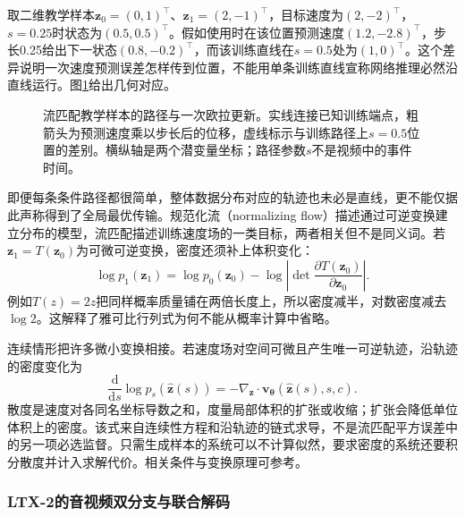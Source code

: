 取二维教学样本$\bm z_0=(0,1)^\top$、$\bm z_1=(2,-1)^\top$，目标速度为$(2,-2)^\top$，$s=0.25$时状态为$(0.5,0.5)^\top$。假如使用时在该位置预测速度$(1.2,-2.8)^\top$，步长0.25给出下一状态$(0.8,-0.2)^\top$，而该训练直线在$s=0.5$处为$(1,0)^\top$。这个差异说明一次速度预测误差怎样传到位置，不能用单条训练直线宣称网络推理必然沿直线运行。图\ref{fig:vision-flow-step}给出几何对应。

\begin{figure}[htbp]
  \centering
  
  \caption{流匹配教学样本的路径与一次欧拉更新。实线连接已知训练端点，粗箭头为预测速度乘以步长后的位移，虚线标示与训练路径上$s=0.5$位置的差别。横纵轴是两个潜变量坐标；路径参数$s$不是视频中的事件时间。}
  \label{fig:vision-flow-step}
\end{figure}

即便每条条件路径都很简单，整体数据分布对应的轨迹也未必是直线，更不能仅据此声称得到了全局最优传输。规范化流（normalizing flow）描述通过可逆变换建立分布的模型，流匹配描述训练速度场的一类目标，两者相关但不是同义词。若$\bm z_1=T(\bm z_0)$为可微可逆变换，密度还须补上体积变化：
\begin{equation}
  \log p_1(\bm z_1)
    =\log p_0(\bm z_0)
       -\log\left|\det
          \frac{\partial T(\bm z_0)}{\partial\bm z_0}\right|.
  \label{eq:vision-flow-density-transform}
\end{equation}
例如$T(z)=2z$把同样概率质量铺在两倍长度上，所以密度减半，对数密度减去$\log2$。这解释了雅可比行列式为何不能从概率计算中省略。

连续情形把许多微小变换相接。若速度场对空间可微且产生唯一可逆轨迹，沿轨迹的密度变化为
\begin{equation}
  \frac{\mathrm d}{\mathrm ds}
        \log p_s(\widehat{\bm z}(s))
    =-\nabla_{\bm z}\cdot
          \bm v_{\bm\theta}(\widehat{\bm z}(s),s,c).
  \label{eq:vision-flow-density-divergence}
\end{equation}
散度是速度对各同名坐标导数之和，度量局部体积的扩张或收缩；扩张会降低单位体积上的密度。该式来自连续性方程和沿轨迹的链式求导，不是流匹配平方误差中的另一项必选监督。只需生成样本的系统可以不计算似然，要求密度的系统还要积分散度并计入求解代价。相关条件与变换原理可参考。

\subsubsection{LTX-2的音视频双分支与联合解码}
\label{sec:vision-models-ltx2}

